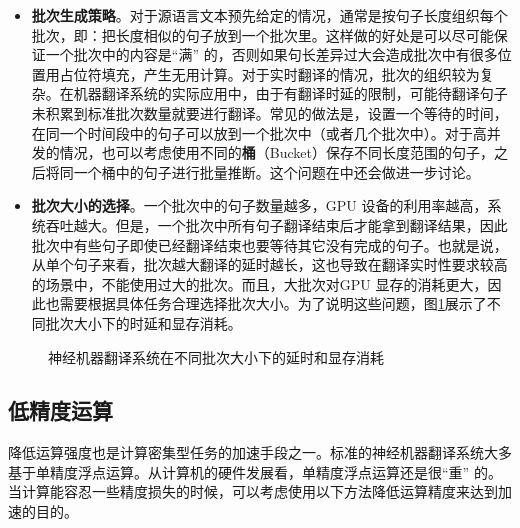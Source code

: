\begin{itemize}
\vspace{0.5em}
\item {\small\sffamily\bfseries{批次生成策略}}。对于源语言文本预先给定的情况，通常是按句子长度组织每个批次，即：把长度相似的句子放到一个批次里。这样做的好处是可以尽可能保证一个批次中的内容是“满” 的，否则如果句长差异过大会造成批次中有很多位置用占位符填充，产生无用计算。对于实时翻译的情况，批次的组织较为复杂。在机器翻译系统的实际应用中，由于有翻译时延的限制，可能待翻译句子未积累到标准批次数量就要进行翻译。常见的做法是，设置一个等待的时间，在同一个时间段中的句子可以放到一个批次中（或者几个批次中）。对于高并发的情况，也可以考虑使用不同的{\small\sffamily\bfseries{桶}}（Bucket）保存不同长度范围的句子，之后将同一个桶中的句子进行批量推断。这个问题在{\chaptereighteen}中还会做进一步讨论。
\vspace{0.5em}
\item {\small\sffamily\bfseries{批次大小的选择}}。一个批次中的句子数量越多，GPU 设备的利用率越高，系统吞吐越大。但是，一个批次中所有句子翻译结束后才能拿到翻译结果，因此批次中有些句子即使已经翻译结束也要等待其它没有完成的句子。也就是说，从单个句子来看，批次越大翻译的延时越长，这也导致在翻译实时性要求较高的场景中，不能使用过大的批次。而且，大批次对GPU 显存的消耗更大，因此也需要根据具体任务合理选择批次大小。为了说明这些问题，图\ref{fig:14-7}展示了不同批次大小下的时延和显存消耗。
\vspace{0.5em}
\end{itemize}

\begin{figure}[htp]
\centering

\caption{神经机器翻译系统在不同批次大小下的延时和显存消耗}
\label{fig:14-7}
\end{figure}


\subsection{低精度运算}

\parinterval 降低运算强度也是计算密集型任务的加速手段之一。标准的神经机器翻译系统大多基于单精度浮点运算。从计算机的硬件发展看，单精度浮点运算还是很“重” 的。当计算能容忍一些精度损失的时候，可以考虑使用以下方法降低运算精度来达到加速的目的。

